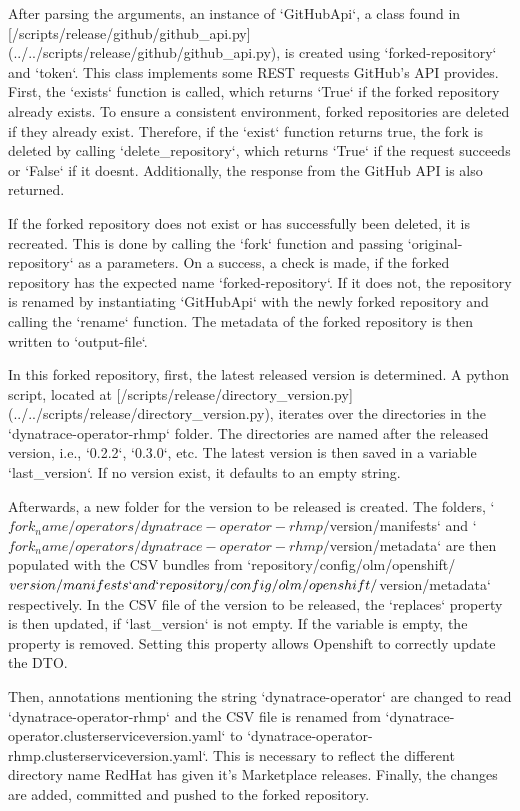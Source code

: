 After parsing the arguments, an instance of `GitHubApi`, a class found in [/scripts/release/github/github_api.py](../../scripts/release/github/github_api.py), is created using `{forked-repository}` and `{token}`.
This class implements some REST requests GitHub's API provides.
First, the `exists` function is called, which returns `True` if the forked repository already exists.
To ensure a consistent environment, forked repositories are deleted if they already exist.
Therefore, if the `exist` function returns true, the fork is deleted by calling `delete_repository`, which returns `True` if the request succeeds or `False` if it doesnt.
Additionally, the response from the GitHub API is also returned.

If the forked repository does not exist or has successfully been deleted, it is recreated.
This is done by calling the `fork` function and passing `{original-repository}` as a parameters.
On a success, a check is made, if the forked repository has the expected name `{forked-repository}`.
If it does not, the repository is renamed by instantiating `GitHubApi` with the newly forked repository and calling the `rename` function.
The metadata of the forked repository is then written to `{output-file}`.

In this forked repository, first, the latest released version is determined.
A python script, located at [/scripts/release/directory_version.py](../../scripts/release/directory_version.py), iterates over the directories in the `dynatrace-operator-rhmp` folder.
The directories are named after the released version, i.e., `0.2.2`, `0.3.0`, etc.
The latest version is then saved in a variable `last_version`.
If no version exist, it defaults to an empty string.

Afterwards, a new folder for the version to be released is created.
The folders, `${fork_name}/operators/dynatrace-operator-rhmp/${version}/manifests` and `${fork_name}/operators/dynatrace-operator-rhmp/${version}/metadata` are then populated with the CSV bundles from `{repository}/config/olm/openshift/${version}/manifests` and `{repository}/config/olm/openshift/${version}/metadata` respectively.
In the CSV file of the version to be released, the `replaces` property is then updated, if `last_version` is not empty.
If the variable is empty, the property is removed.
Setting this property allows Openshift to correctly update the DTO.

Then, annotations mentioning the string `dynatrace-operator` are changed to read `dynatrace-operator-rhmp` and the CSV file is renamed from `dynatrace-operator.clusterserviceversion.yaml` to `dynatrace-operator-rhmp.clusterserviceversion.yaml`.
This is necessary to reflect the different directory name RedHat has given it's Marketplace releases.
Finally, the changes are added, committed and pushed to the forked repository.

